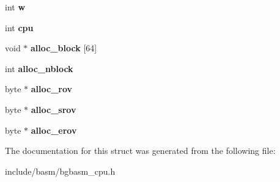\begin{DoxyCompactItemize}
\item 
\hypertarget{structBASM__Context_a3693d5acf317680cef073d5864044cb3}{int {\bfseries w}}\label{structBASM__Context_a3693d5acf317680cef073d5864044cb3}

\item 
\hypertarget{structBASM__Context_a33d6e5374f3ed07c0ec52db3f7d0e346}{int {\bfseries cpu}}\label{structBASM__Context_a33d6e5374f3ed07c0ec52db3f7d0e346}

\item 
\hypertarget{structBASM__Context_a8286549d4caf62281b579711bfef23c1}{void $\ast$ {\bfseries alloc\-\_\-block} \mbox{[}64\mbox{]}}\label{structBASM__Context_a8286549d4caf62281b579711bfef23c1}

\item 
\hypertarget{structBASM__Context_a5efb78ae382af6ace7c3ad10bb3ce3b4}{int {\bfseries alloc\-\_\-nblock}}\label{structBASM__Context_a5efb78ae382af6ace7c3ad10bb3ce3b4}

\item 
\hypertarget{structBASM__Context_a83415f474d47623c5adecfbf0feed6af}{byte $\ast$ {\bfseries alloc\-\_\-rov}}\label{structBASM__Context_a83415f474d47623c5adecfbf0feed6af}

\item 
\hypertarget{structBASM__Context_a3b311cb1638a0a7549a335a904244c62}{byte $\ast$ {\bfseries alloc\-\_\-srov}}\label{structBASM__Context_a3b311cb1638a0a7549a335a904244c62}

\item 
\hypertarget{structBASM__Context_af69294bed850c270a1f97e19e5b36aea}{byte $\ast$ {\bfseries alloc\-\_\-erov}}\label{structBASM__Context_af69294bed850c270a1f97e19e5b36aea}

\end{DoxyCompactItemize}


The documentation for this struct was generated from the following file\-:\begin{DoxyCompactItemize}
\item 
include/basm/bgbasm\-\_\-cpu.\-h\end{DoxyCompactItemize}
